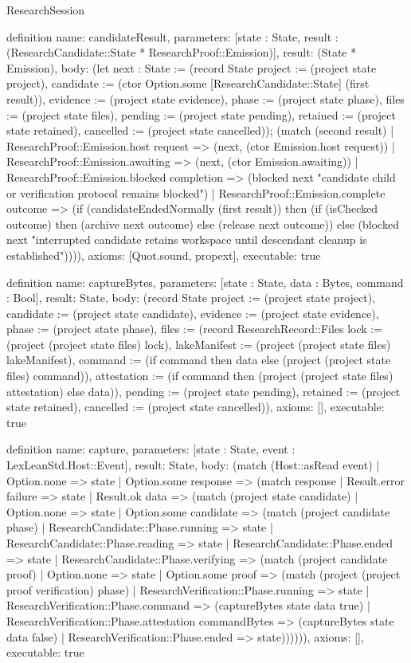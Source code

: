 \begin{lexlean}{ResearchSession}
\begin{semanticmodule}
definition{
 name: candidateResult,
 parameters: [state : State, result : (ResearchCandidate::State * ResearchProof::Emission)],
 result: (State * Emission),
 body: (let next : State := (record State {project := (project state project), candidate := (ctor Option.some [ResearchCandidate::State] (first result)), evidence := (project state evidence), phase := (project state phase), files := (project state files), pending := (project state pending), retained := (project state retained), cancelled := (project state cancelled)}); (match (second result) | ResearchProof::Emission.host request => (next, (ctor Emission.host request)) | ResearchProof::Emission.awaiting => (next, (ctor Emission.awaiting)) | ResearchProof::Emission.blocked completion => (blocked next "candidate child or verification protocol remains blocked") | ResearchProof::Emission.complete outcome => (if (candidateEndedNormally (first result)) then (if (isChecked outcome) then (archive next outcome) else (release next outcome)) else (blocked next "interrupted candidate retains workspace until descendant cleanup is established")))),
 axioms: [Quot.sound, propext],
 executable: true
}

definition{
 name: captureBytes,
 parameters: [state : State, data : Bytes, command : Bool],
 result: State,
 body: (record State {project := (project state project), candidate := (project state candidate), evidence := (project state evidence), phase := (project state phase), files := (record ResearchRecord::Files {lock := (project (project state files) lock), lakeManifest := (project (project state files) lakeManifest), command := (if command then data else (project (project state files) command)), attestation := (if command then (project (project state files) attestation) else data)}), pending := (project state pending), retained := (project state retained), cancelled := (project state cancelled)}),
 axioms: [],
 executable: true
}

definition{
 name: capture,
 parameters: [state : State, event : LexLeanStd.Host::Event],
 result: State,
 body: (match (Host::asRead event) | Option.none => state | Option.some response => (match response | Result.error failure => state | Result.ok data => (match (project state candidate) | Option.none => state | Option.some candidate => (match (project candidate phase) | ResearchCandidate::Phase.running => state | ResearchCandidate::Phase.reading => state | ResearchCandidate::Phase.ended => state | ResearchCandidate::Phase.verifying => (match (project candidate proof) | Option.none => state | Option.some proof => (match (project (project proof verification) phase) | ResearchVerification::Phase.running => state | ResearchVerification::Phase.command => (captureBytes state data true) | ResearchVerification::Phase.attestation commandBytes => (captureBytes state data false) | ResearchVerification::Phase.ended => state)))))),
 axioms: [],
 executable: true
}


\end{semanticmodule}
\end{lexlean}
